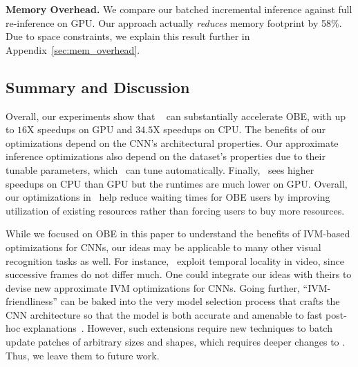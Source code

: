 \vspace{2mm}
\noindent \textbf{Memory Overhead.} We compare our batched incremental inference against full re-inference on GPU. Our approach actually \textit{reduces} memory footprint by 58\%. Due to space constraints, we explain this result further in Appendix~\ref{sec:mem_overhead}.



\vspace{-2mm}
\subsection{Summary and Discussion}
Overall, our experiments show that \system~ can substantially accelerate OBE, with up to $16$X speedups on GPU and $34.5$X speedups on CPU. The benefits of our optimizations depend on the CNN's architectural properties. Our approximate inference optimizations also depend on the dataset's properties due to their tunable parameters, which \system ~can tune automatically. Finally, \system ~sees higher speedups on CPU than GPU but the runtimes are much lower on GPU. Overall, our optimizations in \system ~help reduce waiting times for OBE users by improving utilization of existing resources rather than forcing users to buy more resources.

While we focused on OBE in this paper to understand the benefits of IVM-based optimizations for CNNs, our ideas may be applicable to many other visual recognition tasks as well. For instance,~\cite{cavigelli2017cbinfer,buckler2018eva} exploit temporal locality in video, since successive frames do not differ much. One could integrate our ideas with theirs to devise new approximate IVM optimizations for CNNs. Going further, ``IVM-friendliness'' can be baked into the very model selection process that crafts the CNN architecture so that the model is both accurate and amenable to fast post-hoc explanations~\cite{motamedi2018resource}. However, such extensions require new techniques to batch update patches of arbitrary sizes and shapes, which requires deeper changes to \system. Thus, we leave them to future work.